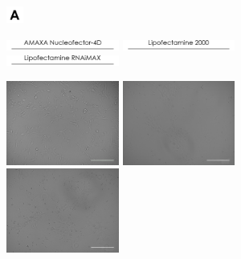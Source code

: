 \documentclass[onecolumn,10pt]{asme2ej}
\begin{document}
\begin{figure}[h]
	\includegraphics[width=0.05\textwidth]{figures/a}
	
	
	\includegraphics[width=0.33\textwidth]{figures/electro/Nucleo.jpg}
	\includegraphics[width=0.33\textwidth]{figures/electro/Lipo2000.jpg}
	\includegraphics[width=0.33\textwidth]{figures/electro/LipoMAX.jpg}
	
	
	\includegraphics[width=0.33\textwidth]{figures/electro/ctrl-elec.jpg}
	\includegraphics[width=0.33\textwidth]{figures/electro/BF2000(D1).jpg}
	\includegraphics[width=0.33\textwidth]{figures/electro/BFMAX(D3).jpg}
	

\end{figure}
\end{document}
